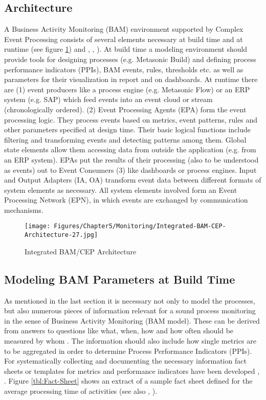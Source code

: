 \subsection{Architecture }
A Business Activity Monitoring (BAM) environment supported by Complex Event Processing consists of several elements necessary at build time and at runtime (see figure \ref{fig:BAMArchitecture}) and \cite{book:processmonitoring}, \cite{book:CEPinAction} , \cite{article:BlueprintEventBPM}). At build time a modeling environment should provide tools for designing processes (e.g. Metasonic Build) and defining process performance indicators (PPIs), BAM events, rules, thresholds etc. as well as parameters for their visualization in report and on dashboards. At runtime there are (1) event producers like a process engine (e.g. Metasonic Flow) or an ERP system (e.g. SAP) which feed events into an event cloud or stream (chronologically ordered). (2) Event Processing Agents (EPA) form the event processing logic. They process events based on metrics, event patterns, rules and other parameters specified at design time. Their basic logical functions include filtering and transforming events and detecting patterns among them. Global state elements allow them accessing data from outside the application (e.g. from an ERP system). EPAs put the results of their processing (also to be understood as events) out to Event Consumers (3) like dashboards or process engines. Input and Output Adapters (IA, OA) transform event data between different formats of system elements as necessary. All system elements involved form an Event Processing Network (EPN), in which events are exchanged by communication mechanisms.

\begin{figure}[htbp]
	\centering
	\texttt{[image: Figures/Chapter5/Monitoring/Integrated-BAM-CEP-Architecture-27.jpg]}
	\caption[Integrated BAM/CEP Architecture 27]{Integrated BAM/CEP Architecture \cite{book:processmonitoring}}
	\label{fig:BAMArchitecture}
\end{figure}



\subsection{Modeling BAM Parameters at Build Time}
As mentioned in the last section it is necessary not only to model the processes, but also numerous pieces of information relevant for a sound process monitoring in the sense of Business Activity Monitoring (BAM model). These can be derived from answers to questions like what, when, how and how often should be measured by whom \cite{book:ProzesseSchmelzer}. The information should also include how single metrics are to be aggregated in order to determine Process Performance Indicators (PPIs). For systematically collecting and documenting the necessary information fact sheets or templates for metrics and performance indicators have been developed \cite{book:KennzahlenIT}, \cite{book:ITControlling}. Figure \ref{tbl:Fact-Sheet}  shows an extract of a sample fact sheet defined for the average processing time of activities (see also \cite{article:SBPMCosting}, \cite{book:MonitoringSubjekt} ).


